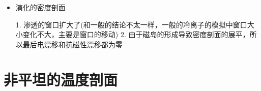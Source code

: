 \documentclass[11pt,a4paper]{article}
\begin{document}
\begin{itemize}
	\item 演化的密度剖面
	\begin{figure}[H]
		\centering
		\caption{}		
	\end{figure}
	1. 渗透的窗口扩大了(和一般的结论不太一样，一般的冷离子的模拟中窗口大小变化不大，主要是窗口的移动)
	2. 由于磁岛的形成导致密度剖面的展平，所以最后电漂移和抗磁性漂移都为零
\end{itemize}


\section{非平坦的温度剖面}
\end{document}
